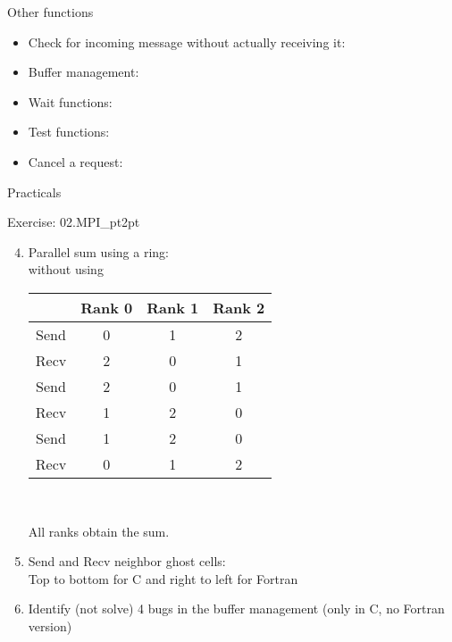 \documentclass[aspectratio=43]{beamer}
\begin{document}
\begin{frame}[fragile]{Other functions}
\begin{itemize}
\item Check for incoming message without actually receiving it:\\\hspace{1cm}
\item Buffer management:\\\hspace{1cm}
\item Wait functions:\\\hspace{1cm}
\item Test functions:\\\hspace{1cm}
\item Cancel a request:\\\hspace{1cm}
\end{itemize}
\end{frame}

\begin{frame}[fragile]{Practicals}
    \begin{brown2block}{Exercise: 02.MPI\_pt2pt}
    \begin{enumerate}
        \setcounter{enumi}{3}
    \item Parallel sum using a ring:\\
        without using \\
        {{\small
            \begin{tabular}{|c||c|c|c|}\hline
                 & Rank 0 & Rank 1 & Rank 2\\\hline
            Send & 0 & 1 & 2 \\\hline
            Recv & 2 & 0 & 1 \\\hline\hline
            Send & 2 & 0 & 1 \\\hline
            Recv & 1 & 2 & 0 \\\hline\hline
            Send & 1 & 2 & 0 \\\hline
            Recv & 0 & 1 & 2 \\\hline
            \end{tabular}\\}}
        All ranks obtain the sum.
        \item Send and Recv neighbor ghost cells:\\
            Top to bottom for C and right to left for Fortran
        \item Identify (not solve) 4 bugs in the buffer management (only in C, no Fortran version)
    \end{enumerate}
    \end{brown2block}
\end{frame}
\end{document}
